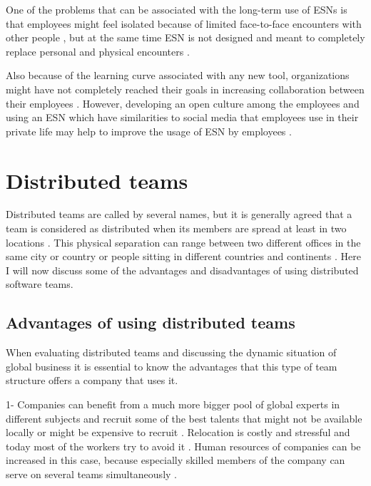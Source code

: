 One of the problems that can be associated with the long-term use of ESNs is that employees might feel isolated because of limited face-to-face encounters with other people \citep{Kane2014}, but at the same time ESN is not designed and meant to completely replace personal and physical encounters \citep{Zhang2013a}.

Also because of the learning curve associated with any new tool, organizations might have not completely reached their goals in increasing collaboration between their employees \citep{Anderson2016}. However, developing an open culture among the employees and using an ESN which have similarities to social media that employees use in their private life may help to improve the usage of ESN by employees \citep{Korzynski2014}. 

\section{Distributed teams} \label{dt}
Distributed teams are called by several names, but it is generally agreed that a team is considered as distributed when its members are spread at least in two locations \citep{Hinds2005}. This physical separation can range between two different offices in the same city or country or people sitting in different countries and continents \citep{Mortensen2001}. Here I will now discuss some of the advantages and disadvantages of using distributed software teams.
\subsection{Advantages of using distributed teams}
When evaluating distributed teams and discussing the dynamic situation of global business it is essential to know the advantages that this type of team structure offers a company that uses it. 

1- Companies can benefit from a much more bigger pool of global experts in different subjects and recruit some of the best talents that might not be available locally or might be expensive to recruit \citep{Snyder2003}. Relocation is costly and stressful and today most of the workers try to avoid it \citep{Lipnack1997,Joinson2002}. Human resources of companies can be increased in this case, because especially skilled members of the company can serve on several teams simultaneously \citep{Hertel2004}. 

